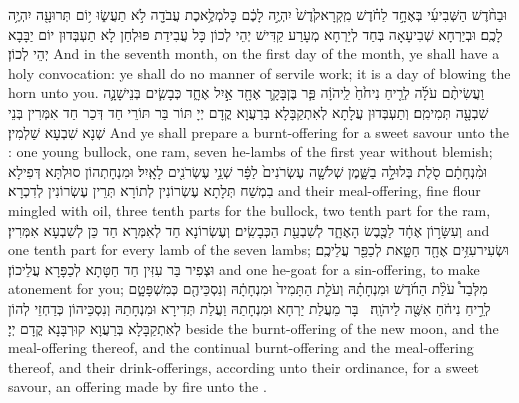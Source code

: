 \newperek
{}%
{וּבַחֹ֨דֶשׁ הַשְּׁבִיעִ֜י בְּאֶחָ֣ד לַחֹ֗דֶשׁ מִֽקְרָא\maqqaf קֹ֙דֶשׁ֙ יִהְיֶ֣ה לָכֶ֔ם כׇּל\maqqaf מְלֶ֥אכֶת עֲבֹדָ֖ה לֹ֣א תַעֲשׂ֑וּ י֥וֹם תְּרוּעָ֖ה יִהְיֶ֥ה לָכֶֽם׃}
{וּבְיַרְחָא שְׁבִיעָאָה בְּחַד לְיַרְחָא מְעָרַע קַדִּישׁ יְהֵי לְכוֹן כָּל עֲבִידַת פּוּלְחַן לָא תַעְבְּדוּן יוֹם יַבָּבָא יְהֵי לְכוֹן׃}
{And in the seventh month, on the first day of the month, ye shall have a holy convocation: ye shall do no manner of servile work; it is a day of blowing the horn unto you.}{}
{וַעֲשִׂיתֶ֨ם עֹלָ֜ה לְרֵ֤יחַ נִיחֹ֙חַ֙ לַֽיהֹוָ֔ה פַּ֧ר בֶּן\maqqaf בָּקָ֛ר אֶחָ֖ד אַ֣יִל אֶחָ֑ד כְּבָשִׂ֧ים בְּנֵי\maqqaf שָׁנָ֛ה שִׁבְעָ֖ה תְּמִימִֽם׃}
{וְתַעְבְּדוּן עֲלָתָא לְאִתְקַבָּלָא בְּרַעֲוָא קֳדָם יְיָ תּוֹר בַּר תּוֹרֵי חַד דְּכַר חַד אִמְּרִין בְּנֵי שְׁנָא שִׁבְעָא שַׁלְמִין׃}
{And ye shall prepare a burnt-offering for a sweet savour unto the \lord: one young bullock, one ram, seven he-lambs of the first year without blemish;}{}
{וּמִ֨נְחָתָ֔ם סֹ֖לֶת בְּלוּלָ֣ה בַשָּׁ֑מֶן שְׁלֹשָׁ֤ה עֶשְׂרֹנִים֙ לַפָּ֔ר שְׁנֵ֥י עֶשְׂרֹנִ֖ים לָאָֽיִל׃}
{וּמִנְחָתְהוֹן סוּלְתָּא דְּפִילָא בִמְשַׁח תְּלָתָא עֶשְׂרוֹנִין לְתוֹרָא תְּרֵין עֶשְׂרוֹנִין לְדִכְרָא׃}
{and their meal-offering, fine flour mingled with oil, three tenth parts for the bullock, two tenth part for the ram,}{}
{וְעִשָּׂר֣וֹן אֶחָ֔ד לַכֶּ֖בֶשׂ הָאֶחָ֑ד לְשִׁבְעַ֖ת הַכְּבָשִֽׂים׃}
{וְעֶשְׂרוֹנָא חַד לְאִמְּרָא חַד כֵּן לְשִׁבְעָא אִמְּרִין׃}
{and one tenth part for every lamb of the seven lambs;}{}
{וּשְׂעִיר\maqqaf עִזִּ֥ים אֶחָ֖ד חַטָּ֑את לְכַפֵּ֖ר עֲלֵיכֶֽם׃}
{וּצְפִיר בַּר עִזִּין חַד חַטָּתָא לְכַפָּרָא עֲלֵיכוֹן׃}
{and one he-goat for a sin-offering, to make atonement for you;}{}
{מִלְּבַד֩ עֹלַ֨ת הַחֹ֜דֶשׁ וּמִנְחָתָ֗הּ וְעֹלַ֤ת הַתָּמִיד֙ וּמִנְחָתָ֔הּ וְנִסְכֵּיהֶ֖ם כְּמִשְׁפָּטָ֑ם לְרֵ֣יחַ נִיחֹ֔חַ אִשֶּׁ֖ה לַיהֹוָֽה׃ \setuma }
{בָּר מֵעֲלַת יַרְחָא וּמִנְחָתַהּ וַעֲלַת תְּדִירָא וּמִנְחָתַהּ וְנִסְכֵּיהוֹן כְּדַחְזֵי לְהוֹן לְאִתְקַבָּלָא בְּרַעֲוָא קוּרְבָּנָא קֳדָם יְיָ׃}
{beside the burnt-offering of the new moon, and the meal-offering thereof, and the continual burnt-offering and the meal-offering thereof, and their drink-offerings, according unto their ordinance, for a sweet savour, an offering made by fire unto the \lord.}{}
